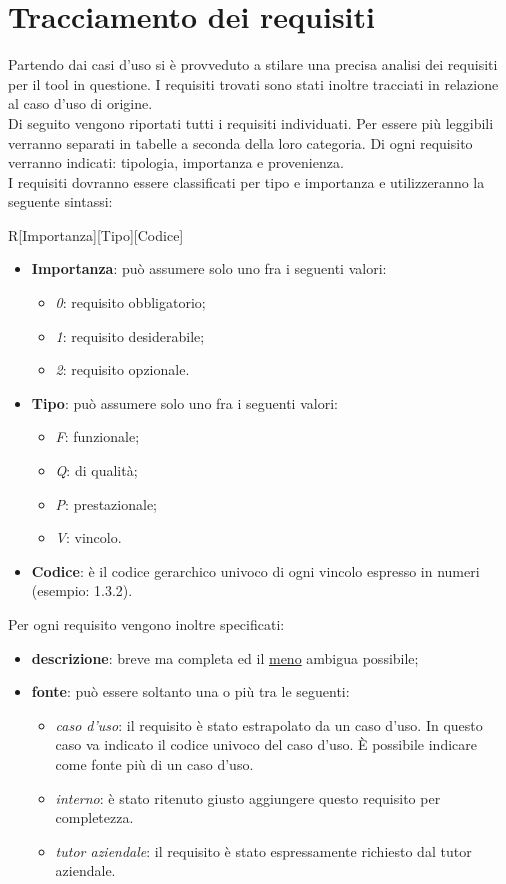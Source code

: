 \section{Tracciamento dei requisiti}
	Partendo dai casi d'uso si è provveduto a stilare una precisa analisi dei requisiti per il tool in questione. I requisiti trovati sono stati inoltre tracciati in relazione al caso d'uso di origine.\\
	
	Di seguito vengono riportati tutti i requisiti individuati. Per essere più leggibili verranno separati in tabelle a seconda della loro categoria. Di ogni requisito verranno indicati: tipologia, importanza e provenienza.\\
	I requisiti dovranno essere classificati per tipo e importanza e utilizzeranno la seguente sintassi:
	\begin{center}
		R[Importanza][Tipo][Codice]
	\end{center}
	\begin{itemize}
		\item \textbf{Importanza}: può assumere solo uno fra i seguenti valori:
		\begin{itemize}
			\item \textit{0}: requisito obbligatorio;
			\item \textit{1}: requisito desiderabile;
			\item \textit{2}: requisito opzionale.
		\end{itemize}
		\item \textbf{Tipo}: pu\`{o} assumere solo uno fra i seguenti valori:
		\begin{itemize}
			\item  \textit{F}: funzionale;
			\item  \textit{Q}: di qualità;
			\item  \textit{P}: prestazionale;
			\item  \textit{V}: vincolo.
		\end{itemize}
		\item \textbf{Codice}: è il codice gerarchico univoco di ogni vincolo espresso in numeri (esempio: 1.3.2).
	\end{itemize}

	Per ogni requisito vengono inoltre specificati:
	\begin{itemize}
		\item \textbf{descrizione}: breve ma completa ed il \underline{meno} ambigua possibile;
		\item \textbf{fonte}: pu\`{o} essere soltanto una o pi\`{u} tra le seguenti:
		\begin{itemize}
			\item \textit{caso d'uso}: il requisito \`{e} stato estrapolato da un caso d'uso. In questo caso va indicato il codice univoco del caso d'uso. \`{E} possibile indicare come fonte pi\`{u} di un caso d'uso.
			\item \textit{interno}: è stato ritenuto giusto aggiungere questo requisito per completezza.
			\item \textit{tutor aziendale}: il requisito è stato espressamente richiesto dal tutor aziendale.
		\end{itemize}
	\end{itemize}


